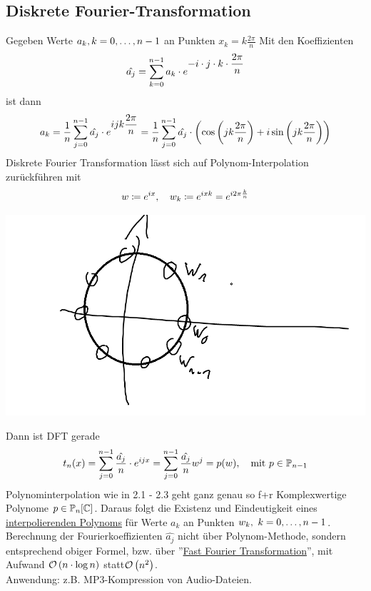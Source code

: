 \documentclass[../Skript.tex]{subfiles}
\begin{document}
\subsection{Diskrete Fourier-Transformation}
Gegeben Werte \(a_k, \igb{k}{0}{n-1}\) an Punkten \(x_k = k\frac{2\pi}{n}\) Mit den Koeffizienten \[
    \hat{a_j} = \displaystyle\sum_{k=0}^{n-1}a_k\cdot e^{\displaystyle-i\cdot j \cdot k \cdot\frac{2\pi}{n}}
\]
ist dann \[
    a_k = \frac{1}{n}\dsum_{j=0}^{n-1}\displaystyle{\hat{a_j}\cdot e^{\displaystyle ijk\frac{2\pi}{n}}} = 
    \frac{1}{n}\dsum_{j=0}^{n-1} \hat{a_j}\cdot\left(\cos{jk\frac{2\pi}{n}}+ i\sin{jk\frac{2\pi}{n}}\right)
\]
Diskrete Fourier Transformation lässt sich auf Polynom-Interpolation zurückführen mit \[
    w\coloneqq e^{ix}, \hspace{1em} w_k \coloneqq e^{ixk} = e^{i2\pi \frac{k}{n} }
\]
\begin{center}
    \includegraphics[width=\linewidth]{Bilder/231122_1.png}
\end{center}
Dann ist DFT gerade \[
    t_n(x) = \displaystyle\sum_{j=0}^{n-1}\frac{\hat{a_j}}{n}\cdot e^{ijx} = \displaystyle\sum_{j=0}^{n-1}\frac{\hat{a_j}}{n}w^j = p(w), 
    \hspace{1em} \text{mit } p\in \mathbb{P}_{n-1}
\]
Polynominterpolation wie in 2.1 - 2.3 geht ganz genau so f+r Komplexwertige Polynome \(p\in\mathbb{P}_n[\mathbb{C}]\). Daraus folgt
die Existenz und Eindeutigkeit eines \underline{interpolierenden Polynoms} für Werte \(a_k\) an Punkten \(w_k, \ \igb{k}
{0}{n-1}\). Berechnung der Fourierkoeffizienten \(\hat{a_j}\) nicht über Polynom-Methode, sondern entsprechend obiger Formel,
bzw. über ''\underline{Fast Fourier Transformation}'', mit Aufwand \(\calO{n\cdot\log n}\) statt\(\calO{n^2}\). \\
Anwendung: z.B. MP3-Kompression von Audio-Dateien.
\end{document}
